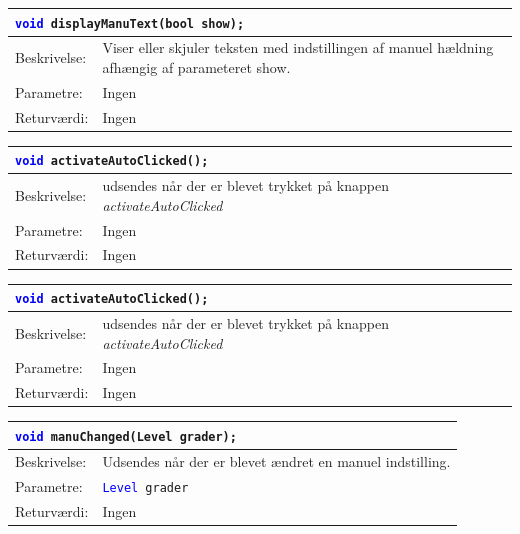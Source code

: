 \begin{table}[H]
\begin{tabular}{l p{12.5cm}}
\multicolumn{2}{l}{\texttt{\textcolor{blue}{void} displayManuText(bool show);}} \\
\hline
Beskrivelse:&Viser eller skjuler teksten med indstillingen af manuel hældning afhængig af parameteret show.\\    
Parametre:&Ingen\\
Returværdi:&Ingen\\
\end{tabular}
\end{table}



\begin{table}[H]
\begin{tabular}{l p{12.5cm}}
\multicolumn{2}{l}{\texttt{\textcolor{blue}{void} activateAutoClicked();}} \\
\hline
Beskrivelse:& udsendes når der er blevet trykket på knappen \textit{activateAutoClicked}\\
Parametre:&Ingen\\
Returværdi:&Ingen\\
\end{tabular}
\end{table}


\begin{table}[H]
\begin{tabular}{l p{12.5cm}}
\multicolumn{2}{l}{\texttt{\textcolor{blue}{void} activateAutoClicked();}} \\
\hline
Beskrivelse:& udsendes når der er blevet trykket på knappen \textit{activateAutoClicked}\\
Parametre:&Ingen\\
Returværdi:&Ingen\\
\end{tabular}
\end{table}


\begin{table}[H]
\begin{tabular}{l p{12.5cm}}
\multicolumn{2}{l}{\texttt{\textcolor{blue}{void} manuChanged(Level grader);}} \\
\hline
Beskrivelse:&Udsendes når der er blevet ændret en manuel indstilling.\\
Parametre:&\texttt{\textcolor{blue}{Level} grader}\\
Returværdi:&Ingen\\
\end{tabular}
\end{table}


